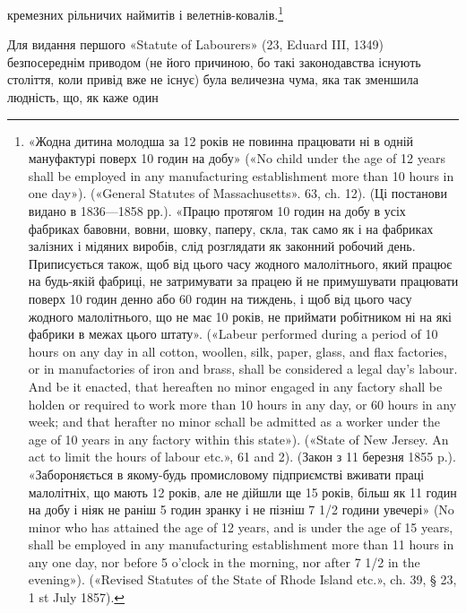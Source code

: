 кремезних рільничих наймитів і велетнів-ковалів.\footnote{
«Жодна дитина молодша за 12 років не повинна працювати ні в
одній мануфактурі поверх 10 годин на добу» («No child under the age
of 12 years shall be employed in any manufacturing establishment more
than 10 hours in one day»). («General Statutes of Massachusetts». 63, ch. 12).
(Ці постанови видано в 1836—1858 рр.). «Працю протягом 10 годин на
добу в усіх фабриках бавовни, вовни, шовку, паперу, скла, так само як
і на фабриках залізних і мідяних виробів, слід розглядати як законний
робочий день. Приписується також, щоб від цього часу жодного малолітнього,
який працює на будь-якій фабриці, не затримувати за працею й
не примушувати працювати поверх 10 годин денно або 60 годин на тиждень,
і щоб від цього часу жодного малолітнього, що не має 10 років, не приймати
робітником ні на які фабрики в межах цього штату». («Labeur performed
during a period of 10 hours on any day in all cotton, woollen, silk,
paper, glass, and flax factories, or in manufactories of iron and brass,
shall be considered a legal day’s labour. And be it enacted, that hereaften
no minor engaged in any factory shall be holden or required to work more
than 10 hours in any day, or 60 hours in any week; and that herafter no
minor schall be admitted as a worker under the age of 10 years in any factory
within this state»). («State of New Jersey. An act to limit the hours of labour
etc.», 61 and 2). (Закон з 11 березня 1855 p.). «Забороняється в якому-будь
промисловому підприємстві вживати праці малолітніх, що мають
12 років, але не дійшли ще 15 років, більш як 11 годин на добу і ніяк не
раніш 5 годин зранку і не пізніш 7 1/2 години увечері» (No minor who has
attained the age of 12 years, and is under the age of 15 years, shall be employed
in any manufacturing establishment more than 11 hours in any one day,
nor before 5 o’clock in the morning, nor after 7 1/2 in the evening»). («Revised
Statutes of the State of Rhode Island etc.», ch. 39, § 23, 1 st July 1857).
}

Для видання першого «Statute of Labourers» (23, Eduard
III, 1349) безпосереднім приводом (не його причиною, бо такі
законодавства існують століття, коли привід вже не існує) була
величезна чума, яка так зменшила людність, що, як каже один
\parbreak{}  %
